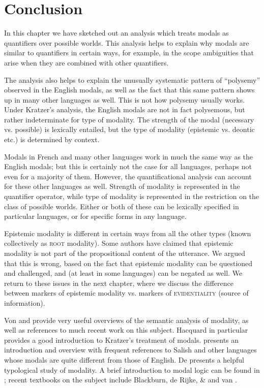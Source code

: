 \section{Conclusion}\label{sec:16.6}

In this chapter we have sketched out an analysis which treats modals as quantifiers over possible worlds. This analysis helps to explain why modals are similar to quantifiers in certain ways, for example, in the scope ambiguities that arise when they are combined with other quantifiers.



The analysis also helps to explain the unusually systematic pattern of “polysemy” observed in the English modals, as well as the fact that this same pattern shows up in many other languages as well. This is not how polysemy usually works. Under Kratzer’s analysis, the English modals are not in fact polysemous, but rather indeterminate for type of modality. The strength of the modal (necessary vs. possible) is lexically entailed, but the type of modality (epistemic vs. deontic etc.) is determined by context.



Modals in French and many other languages work in much the same way as the English modals; but this is certainly not the case for all languages, perhaps not even for a majority of them. However, the quantificational analysis can account for these other languages as well. Strength of modality is represented in the quantifier operator, while type of modality is represented in the restriction on the class of possible worlds. Either or both of these can be lexically specified in particular languages, or for specific forms in any language.



Epistemic modality is different in certain ways from all the other types (known collectively as \textsc{root} modality). Some authors have claimed that epistemic modality is not part of the propositional content of the utterance. We argued that this is wrong, based on the fact that epistemic modality can be questioned and challenged, and (at least in some languages) can be negated as well. We return to these issues in the next chapter, where we discuss the difference between markers of epistemic modality vs. markers of \textsc{evidentiality} (source of information).



\furtherreading



Von \citet{Fintel2006} and \citet{Hacquard2011} provide very useful overviews of the semantic analysis of modality, as well as references to much recent work on this subject. Hacquard in particular provides a good introduction to Kratzer’s treatment of modals. \citet{Matthewson2016} presents an introduction and overview with frequent references to Salish and other languages whose modals are quite different from those of English. De \citet{Haan2006} presents a helpful typological study of modality. A brief introduction to modal logic can be found in \citet{Garson2016}; recent textbooks on the subject include Blackburn, de Rijke, \& \citet{Venema2008} and van \citet{Benthem2010}.


